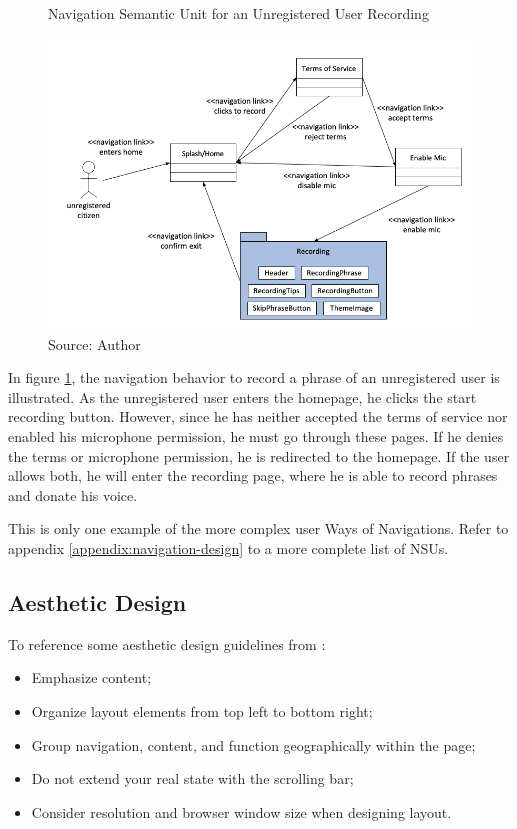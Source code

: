 \begin{figure}[h]
    \centering
    \caption{Navigation Semantic Unit for an Unregistered User Recording}
    \label{fig:app-nsu-example}
    \includegraphics[width=\linewidth]{images/sw-req-spec/nsu-unregistered.png}
    \caption*{Source: Author}
\end{figure}

In figure \ref{fig:app-nsu-example}, the navigation behavior to record a phrase of an unregistered user is illustrated. As the unregistered user enters the homepage, he clicks the start recording button. However, since he has neither accepted the terms of service nor enabled his microphone permission, he must go through these pages. If he denies the terms or microphone permission, he is redirected to the homepage. If the user allows both, he will enter the recording page, where he is able to record phrases and donate his voice.

This is only one example of the more complex user Ways of Navigations. Refer to appendix \ref{appendix:navigation-design} to a more complete list of NSUs.

\subsection{Aesthetic Design}
\label{sec:aesthetic-design}

To reference some aesthetic design guidelines from \cite{pressman2014software}:

\begin{itemize}
    \item Emphasize content;
    \item Organize layout elements from top left to bottom right;
    \item Group navigation, content, and function geographically within the page;
    \item Do not extend your real state with the scrolling bar;
    \item Consider resolution and browser window size when designing layout.
\end{itemize}

